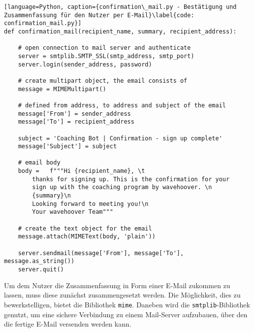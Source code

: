         \begin{lstlisting}[language=Python, caption={confirmation\_mail.py - Bestätigung und Zusammenfassung für den Nutzer per E-Mail}\label{code: confirmation_mail.py}]
def confirmation_mail(recipient_name, summary, recipient_address):

    # open connection to mail server and authenticate
    server = smtplib.SMTP_SSL(smtp_address, smtp_port)
    server.login(sender_address, password)

    # create multipart object, the email consists of
    message = MIMEMultipart()

    # defined from address, to address and subject of the email
    message['From'] = sender_address
    message['To'] = recipient_address

    subject = 'Coaching Bot | Confirmation - sign up complete'
    message['Subject'] = subject

    # email body
    body =   f"""Hi {recipient_name}, \t
        thanks for signing up. This is the confirmation for your 
        sign up with the coaching program by wavehoover. \n 
        {summary}\n
        Looking forward to meeting you!\n
        Your wavehoover Team"""
    
    # create the text object for the email
    message.attach(MIMEText(body, 'plain'))

    server.sendmail(message['From'], message['To'], message.as_string())
    server.quit()
        \end{lstlisting}

                Um dem Nutzer die Zusammenfassung in Form einer E-Mail zukommen zu lassen, muss diese zunächst zusammengesetzt werden. Die Möglichkeit, dies zu bewerkstelligen, bietet die Bibliothek \verb|mime|. \cite{email.mime} Daneben wird die \verb|smtplib|-Bibliothek genutzt, um eine sichere Verbindung zu einem Mail-Server aufzubauen, über den die fertige E-Mail versenden werden kann. \cite{smtplib}\\

